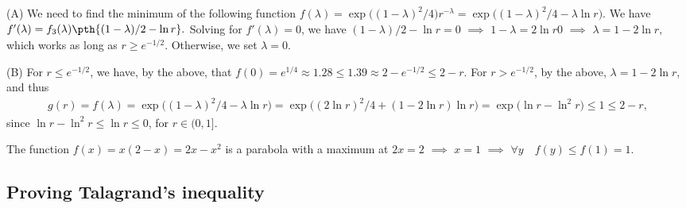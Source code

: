 \begin{tedium}
    (A)
    We need to find the minimum of the following function
    \begin{math}
        f(\lambda) = \exp\bigl( (1-\lambda)^2/4 )r^{-\lambda} =
        \exp\bigl( (1-\lambda)^2/4 -\lambda \ln r ).
    \end{math}
    We have
    \begin{math}
        f'(\lambda) = f_3(\lambda) \pth{\bigl. (1- \lambda)/2 - \ln
           r}.
    \end{math}
    Solving for $f'(\lambda) = 0$, we have
    \begin{math}
        (1- \lambda)/2 - \ln r =0
    \end{math}
    $\implies$
    \begin{math}
        1- \lambda  =2 \ln r0
    \end{math}    
    $\implies$
    \begin{math}
        \lambda = 1- 2 \ln r,
    \end{math}
    which works as long as $r \geq e^{-1/2}$. Otherwise, we set
    $\lambda = 0$.

    (B) For $r \leq e^{-1/2}$, we have, by the above, that
    \begin{math}
        f(0) = e^{1/4} \approx 1.28 \leq 1.39 \approx 2 -e^{-1/2} \leq
        2-r.
    \end{math}
    For $r > e^{-1/2}$, by the above, $\lambda=1-2\ln r$, and thus
    \begin{align*}
      g(r) = 
      f(\lambda)%
      =%
      \exp\bigl( (1-\lambda)^2/4 -\lambda \ln r )%
      =%
      \exp\bigl( (2 \ln r)^2/4 +(1-2\ln r) \ln r \bigr)
      =%
      \exp\bigl(  \ln r - \ln^2 r)
      \leq%
      1 \leq 2-r,
    \end{align*}
    since $\ln r - \ln^2 r \leq \ln r \leq 0$, for $r \in (0,1]$.
\end{tedium}

\begin{tedium}
    The function $f(x) = x(2-x) = 2x - x^2$ is a parabola with a
    maximum at $2x = 2$ $\implies$ $x=1$ $\implies$
    $\forall y \quad f(y) \leq f(1) = 1$.
\end{tedium}

\subsection{Proving Talagrand's inequality}

